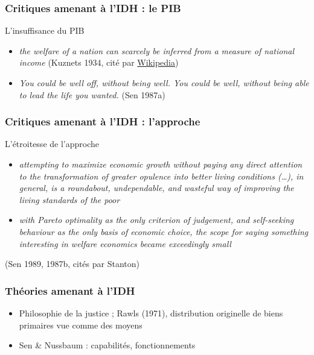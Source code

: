 \documentclass[french]{beamer}
\begin{document}
\begin{frame}
	\frametitle{Critiques amenant à l’IDH : le PIB}
  \begin{block}{L’insuffisance du PIB}
    \begin{itemize}
      \item \emph{the welfare of a nation can scarcely be inferred from a measure of national income} {\small (Kuznets 1934, cité par \href{https://en.wikipedia.org/wiki/Simon_Kuznets\#National_income_accounts}{Wikipedia})} %
      \item \emph{You could be well off, without being well. You could be well, without being able to lead the life you wanted.} {\small (Sen 1987a)}%
    \end{itemize}
  \end{block}
\end{frame}

\begin{frame}
	\frametitle{Critiques amenant à l’IDH : l’approche}
  \begin{block}{L’étroitesse de l’approche}
    \begin{itemize}
      \item \emph{ attempting to maximize economic growth without paying any direct attention to the transformation of greater opulence into better living conditions (…), in general, is a roundabout, undependable, and wasteful way of improving the living standards of the poor}
      \item \emph{with Pareto optimality as the only criterion of judgement, and self-seeking behaviour as the only basis of economic choice, the scope for saying something interesting in welfare economics became exceedingly small}
    \end{itemize}
    {\small (Sen 1989, 1987b, cités par Stanton)}
  \end{block}
\end{frame}

\begin{frame}
	\frametitle{Théories amenant à l’IDH}
  \begin{itemize}
    \item Philosophie de la justice ; Rawls (1971), distribution originelle de biens primaires vue comme des moyens
    \item Sen \& Nussbaum : capabilités, fonctionnements
  \end{itemize}
\end{frame}
\end{document}
